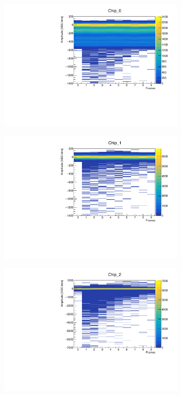 \documentclass[12pt]{article}
\begin{document}
 
\begin{figure}[H]
    	 \centering
\begin{subfigure}[b]{0.45\textwidth}
	\centering
	\includegraphics[width=\textwidth]{Chip_0_A2fr_hist}
\end{subfigure}
\begin{subfigure}[b]{0.45\textwidth}
	\centering
	\includegraphics[width=\textwidth]{Chip_1_A2fr_hist}
\end{subfigure}
\begin{subfigure}[b]{0.45\textwidth}
	\centering
	\includegraphics[width=\textwidth]{Chip_2_A2fr_hist}

\end{subfigure}
\end{figure}
\end{document}
